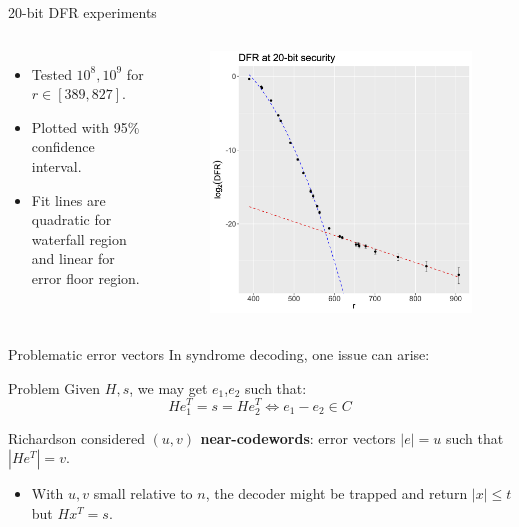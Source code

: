 \begin{frame}{20-bit DFR experiments}

\begin{columns}

\begin{itemize}
    \item Tested $10^8, 10^9$ for $r \in [389, 827]$.
    \item Plotted with 95\% confidence interval.
    \item Fit lines are quadratic for waterfall region and linear for error floor region.
\end{itemize}

\begin{figure}
    \centering
    \includegraphics[scale=.07]{Images/DFR-plot-T3.png}
\end{figure}

\end{columns}
    
\end{frame}

\begin{frame}{Problematic error vectors}
In syndrome decoding, one issue can arise:

\begin{block}{Problem}
Given $H,s$, we may get $e_1$,$e_2$ such that:
     \[  He_1^T = s = He_2^T \iff e_1- e_2 \in C\]

    
\end{block}
Richardson considered \textbf{$(u,v)$ near-codewords}: error vectors $|e| = u$ such that $|He^T| = v$. 
    
    \begin{itemize}
        \item With $u,v$ small relative to $n$, the decoder might be trapped and return $|x| \leq t$ but $Hx^T = s$.
    \end{itemize}
    

\end{frame}


